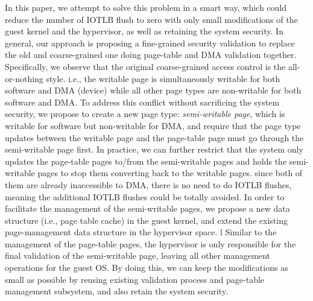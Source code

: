 In this paper, we attempt to solve this problem in a smart way, which could reduce the number of IOTLB flush to zero with only small modifications of the guest kernel and the hypervisor,
as well as retaining the system security.
In general, our approach is proposing a fine-grained security validation to replace the old and coarse-grained one doing page-table and DMA validation together.
Specifically, we observe that the original coarse-grained access control is the all-or-nothing style. i.e., the writable page is simultaneously writable for both software and DMA (device) while all other page types are non-writable for both software and DMA.
To address this conflict without sacrificing the system security, we propose to create a new page type: \emph{semi-writable page}, which is writable for software but non-writable for DMA,
and require that the page type updates between the writable page and the page-table page must go through the semi-writable page first.
In practice,  we can further restrict that the system only updates the page-table pages to/from the semi-writable pages and holds the semi-writable pages to stop them converting back to the writable pages.
since both of them are already inaccessible to DMA, there is no need to do IOTLB flushes, meaning the additional IOTLB flushes could be totally avoided.
In order to facilitate the management of the semi-writable pages, we propose a new data structure (i.e., page table cache) in the guest kernel, and extend the existing page-management data structure in the hypervisor space.         l
Similar to the management of the page-table pages, the hypervisor is only responsible for the final validation of the semi-writable page, leaving all other management operations for the guest OS.
By doing this, we can keep the modifications as small as possible by reusing existing validation process and page-table management subsystem, and also retain the system security.


